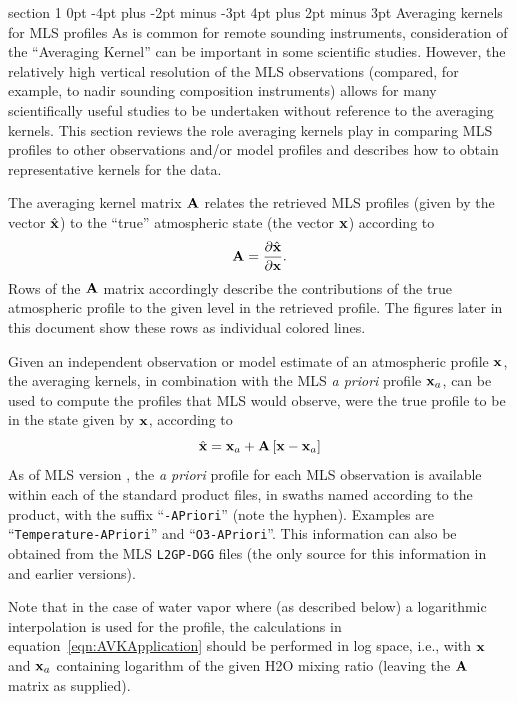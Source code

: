 \documentclass[11pt,draft]{report}
\makeatletter
\renewcommand{\section}{\@startsection%
  {section}%
  {1}%
  {0pt}%
  {-4pt plus -2pt minus -3pt}%
  {4pt plus 2pt minus 3pt}%
  {\Large\sffamily\fontseries{sb}\selectfont\flushleft\color{SectionColor}\figureversion{tabular}}}%
\makeatother
\begin{document}
\section{Averaging kernels for MLS \thisv profiles}
\label{sec:AveragingKernels}
As is common for remote sounding instruments, consideration of the
``Averaging Kernel'' \citep[e.g.,][]{Rodgers00} can be important in some
scientific studies.  However, the relatively high vertical resolution of
the MLS observations (compared, for example, to nadir sounding
composition instruments) allows for many scientifically useful studies
to be undertaken without reference to the averaging kernels.  This
section reviews the role averaging kernels play in comparing MLS
profiles to other observations and/or model profiles and describes how
to obtain representative kernels for the \thisv data.

The averaging kernel matrix $\mathbf{A}$ relates the retrieved MLS profiles
(given by the vector $\hat{\mathbf{x}}$) to the ``true'' atmospheric state (the
vector $\mathbf{x}$) according to
\begin{equation}
  \mathbf{A} = \frac{\partial\hat{\mathbf{x}}}{\partial\mathbf{x}}.
\end{equation}
Rows of the $\mathbf{A}$ matrix accordingly describe the contributions of the
true atmospheric profile to the given level in the retrieved profile.
The figures later in this document show these rows as individual colored
lines.

Given an independent observation or model estimate of an atmospheric
profile $\mathbf{x}$, the averaging kernels, in combination with the MLS
\emph{a priori} profile $\mathbf{x}_a$, can be used to compute the profiles
that MLS would observe, were the true profile to be in the state given
by $\mathbf{x}$, according to
\begin{equation}
  \hat{\mathbf{x}} = \mathbf{x}_a + \mathbf{A}\left[\mathbf{x}-\mathbf{x}_a\right]
\label{eqn:AVKApplication}
\end{equation}
As of MLS version \thisv, the \emph{a priori} profile for each MLS
observation is available within each of the standard product files, in
swaths named according to the product, with the suffix
``\texttt{-APriori}'' (note the hyphen).  Examples are
``\texttt{Temperature-APriori}'' and ``\texttt{O3-APriori}''.  This
information can also be obtained from the MLS \texttt{L2GP-DGG} files
(the only source for this information in \prevv and earlier versions).

Note that in the case of water vapor where (as described below) a
logarithmic interpolation is used for the profile, the calculations in
equation~\ref{eqn:AVKApplication} should be performed in log space,
i.e., with $\mathbf{x}$ and $\mathbf{x}_a$ containing logarithm of the given
H\cs2O mixing ratio (leaving the $\mathbf{A}$ matrix as supplied).
\end{document}
